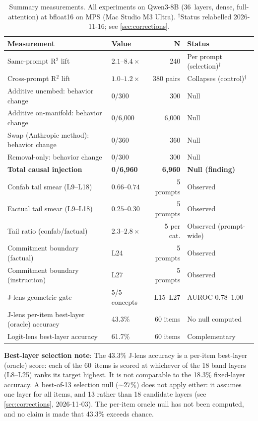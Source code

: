 \documentclass[11pt,a4paper]{article}
\begin{document}
\begin{table}[ht]
\centering
\small
\caption{Summary measurements. All experiments on Qwen3-8B (36~layers,
dense, full-attention) at bfloat16 on MPS (Mac Studio M3 Ultra).
$^{\dagger}$Status relabelled 2026-11-16; see \cref{sec:corrections}.}
\label{tab:numbers}
\begin{tabular}{llrl}
\toprule
\textbf{Measurement} & \textbf{Value} & \textbf{N} & \textbf{Status} \\
\midrule
Same-prompt R$^2$ lift & $2.1$--$8.4\times$ & 240 & Per prompt (selection)$^{\dagger}$ \\
Cross-prompt R$^2$ lift & $1.0$--$1.2\times$ & 380 pairs & Collapses (control)$^{\dagger}$ \\
Additive unembed: behavior change & 0/300 & 300 & Null \\
Additive on-manifold: behavior change & 0/6{,}000 & 6{,}000 & Null \\
Swap (Anthropic method): behavior change & 0/360 & 360 & Null \\
Removal-only: behavior change & 0/300 & 300 & Null \\
\textbf{Total causal injection} & \textbf{0/6{,}960} & \textbf{6{,}960} & \textbf{Null (finding)} \\
\addlinespace
Confab tail smear (L9--L18) & $0.66$--$0.74$ & 5 prompts & Observed \\
Factual tail smear (L9--L18) & $0.25$--$0.30$ & 5 prompts & Observed \\
Tail ratio (confab/factual) & $2.3$--$2.8\times$ & 5 per cat. & Observed (prompt-wide) \\
Commitment boundary (factual) & L24 & 5 prompts & Observed \\
Commitment boundary (instruction) & L27 & 5 prompts & Observed \\
\addlinespace
J-lens geometric gate & 5/5 concepts & L15--L27 & AUROC $0.78$--$1.00$ \\
J-lens per-item best-layer (oracle) accuracy & 43.3\% & 60 items & No null computed \\
Logit-lens best-layer accuracy & 61.7\% & 60 items & Complementary \\
\bottomrule
\end{tabular}
\end{table}

\noindent\textbf{Best-layer selection note}: The 43.3\% J-lens accuracy is a per-item best-layer (oracle) score: each of the 60~items is scored at whichever of the 18 band layers (L8--L25) ranks its target highest. It is not comparable to the 18.3\% fixed-layer accuracy. A best-of-13 selection null (${\sim}27\%$) does not apply either: it assumes one layer for all items, and 13 rather than 18 candidate layers (see \cref{sec:corrections}, 2026-11-03). The per-item oracle null has not been computed, and no claim is made that 43.3\% exceeds chance.
\end{document}

